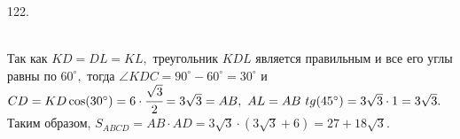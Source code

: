 122. \begin{figure}[ht!]
\end{figure}\\
Так как $KD=DL=KL,$ треугольник $KDL$ является правильным и все его углы равны по $60^\circ,$ тогда $\angle KDC=90^\circ-60^\circ=30^\circ$ и $CD=KD\cos(30^\circ)=6\cdot\cfrac{\sqrt{3}}{2}=3\sqrt{3}=AB,\ AL=AB\ tg(45^\circ)=3\sqrt{3}\cdot1=3\sqrt{3}.$ Таким образом, $S_{ABCD}=AB\cdot AD=3\sqrt{3}\cdot(3\sqrt{3}+6)=27+18\sqrt{3}.$\\
